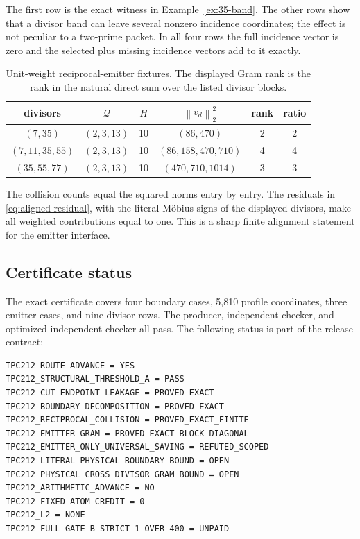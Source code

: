 \documentclass[11pt]{article}
\theoremstyle{definition}
\theoremstyle{remark}
\newcommand{\norm}[1]{\left\lVert #1\right\rVert}
\begin{document}
The first row is the exact witness in Example~\ref{ex:35-band}.  The other
rows show that a divisor band can leave several nonzero incidence coordinates;
the effect is not peculiar to a two-prime packet.  In all four rows the full
incidence vector is zero and the selected plus missing incidence vectors add
to it exactly.

\begin{table}[t]
\centering
\caption{Unit-weight reciprocal-emitter fixtures.  The displayed Gram rank is
the rank in the natural direct sum over the listed divisor blocks.}
\label{tab:emitter-cases}
\begin{tabular}{@{}c c c c c c@{}}
\toprule
divisors & $\mathcal Q$ & $H$ & $\norm{v_d}_2^2$ & rank & ratio\\
\midrule
$(7,35)$ & $(2,3,13)$ & 10 & $(86,470)$ & 2 & 2\\
$(7,11,35,55)$ & $(2,3,13)$ & 10 & $(86,158,470,710)$ & 4 & 4\\
$(35,55,77)$ & $(2,3,13)$ & 10 & $(470,710,1014)$ & 3 & 3\\
\bottomrule
\end{tabular}
\end{table}

The collision counts equal the squared norms entry by entry.  The residuals in
\eqref{eq:aligned-residual}, with the literal M\"obius signs of the displayed
divisors, make all weighted contributions equal to one.  This is a sharp
finite alignment statement for the emitter interface.

\subsection{Certificate status}

The exact certificate covers four boundary cases, 5,810 profile coordinates,
three emitter cases, and nine divisor rows.  The producer, independent checker,
and optimized independent checker all pass.  The following status is part of
the release contract:
\begin{verbatim}
TPC212_ROUTE_ADVANCE = YES
TPC212_STRUCTURAL_THRESHOLD_A = PASS
TPC212_CUT_ENDPOINT_LEAKAGE = PROVED_EXACT
TPC212_BOUNDARY_DECOMPOSITION = PROVED_EXACT
TPC212_RECIPROCAL_COLLISION = PROVED_EXACT_FINITE
TPC212_EMITTER_GRAM = PROVED_EXACT_BLOCK_DIAGONAL
TPC212_EMITTER_ONLY_UNIVERSAL_SAVING = REFUTED_SCOPED
TPC212_LITERAL_PHYSICAL_BOUNDARY_BOUND = OPEN
TPC212_PHYSICAL_CROSS_DIVISOR_GRAM_BOUND = OPEN
TPC212_ARITHMETIC_ADVANCE = NO
TPC212_FIXED_ATOM_CREDIT = 0
TPC212_L2 = NONE
TPC212_FULL_GATE_B_STRICT_1_OVER_400 = UNPAID
\end{verbatim}
\end{document}

